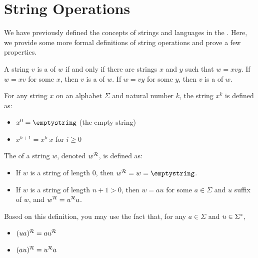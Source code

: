 
\section{String Operations}

\begin{discussion}
We have previously defined the concepts of strings and languages in the . Here, we provide some more formal definitions of string operations and prove a few properties.
\end{discussion}

\begin{defn}
A string $v$ is a  of $w$ if and only if there are strings $x$ and $y$ such that $w = xvy$. If $w = xv$ for some $x$, then $v$ is a  of $w$. If $w = vy$ for some $y$, then $v$ is a  of $w$.
\end{defn}

\begin{defn}
For any string $x$ on an alphabet $\Sigma$ and natural number $k$, the string $x^k$ is defined as:
\begin{itemize}
\item $x^0 = \emptystring$ \quad (the empty string)
\item $x^{k+1} = x^k ~x$ \quad for $i \geq 0$
\end{itemize}
\end{defn}

\begin{defn}
The  of a string $w$, denoted $w^{\mathcal{R}}$, is defined as:
\begin{itemize}
\item If $w$ is a string of length $0$, then $\stringrev{w} = w = \emptystring$.
\item If $w$ is a string of length $n+1 > 0$, then $w = au$ for some $a \in \Sigma$ and $u$ suffix of $w$, and $w^{\mathcal{R}} = u^{\mathcal{R}}a$.
\end{itemize}
Based on this definition, you may use the fact that, for any $a \in \Sigma$ and $u \in \Sigma^{*}$,
\begin{itemize}
\item $(ua)^{\mathcal{R}} = au^{\mathcal{R}}$
\item $(au)^{\mathcal{R}} = u^{\mathcal{R}}a$
\end{itemize}
\end{defn}


